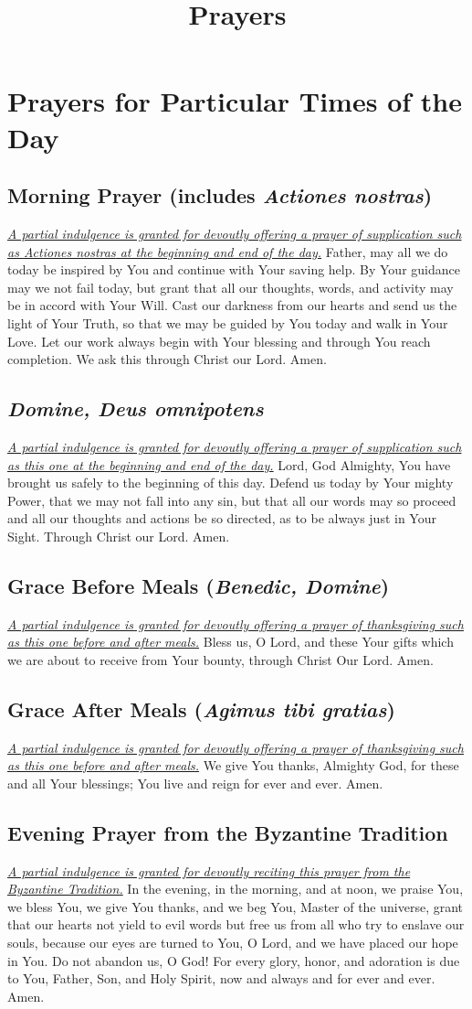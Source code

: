\documentclass[12pt]{article}
\newcommand{\prayersection}[1]{\section{#1}}
\newcommand{\prayertitle}[1]{\subsection{#1}}
\newcommand{\indulgencedprayertitle}[1]{\prayertitle{#1 \protect\kreuz}}
\newcommand{\emphasis}[1]{\emph{#1}}
\newcommand{\emphasis}[1]{\textsl{#1}}
\newcommand{\foreign}[1]{\emphasis{#1}}
\newcommand{\note}[1]{{\small{\emphasis{#1}}}\newline}
\newcommand{\linkednote}[2]{\hyperlink{#1}{\note{#2}}}
\begin{document}
\title{\textbf{Prayers}\date{\vspace{-10ex}}}\maketitle
\tableofcontents\newpage

\prayersection{Prayers for Particular Times of the Day}
\indulgencedprayertitle{Morning Prayer (includes \foreign{Actiones nostras})}
\linkednote{grant26}{A partial indulgence is granted for devoutly offering a prayer of supplication such as \foreign{Actiones nostras} at the beginning and end of the day.}
Father, may all we do today be inspired by You and continue with Your saving help.
By Your guidance may we not fail today, but grant that all our thoughts, words, and activity may be in accord with Your Will.
Cast our darkness from our hearts and send us the light of Your Truth, so that we may be guided by You today and walk in Your Love.
Let our work always begin with Your blessing and through You reach completion.
We ask this through Christ our Lord.
Amen.

\indulgencedprayertitle{\foreign{Domine, Deus omnipotens}}
\linkednote{grant26}{A partial indulgence is granted for devoutly offering a prayer of supplication such as this one at the beginning and end of the day.}
Lord, God Almighty, You have brought us safely to the beginning of this day.
Defend us today by Your mighty Power, that we may not fall into any sin, but that all our words may so proceed and all our thoughts and actions be so directed, as to be always just in Your Sight.
Through Christ our Lord.
Amen.

\indulgencedprayertitle{Grace Before Meals (\foreign{Benedic, Domine})}
\linkednote{grant26}{A partial indulgence is granted for devoutly offering a prayer of thanksgiving such as this one before and after meals.}
Bless us, O Lord, and these Your gifts which we are about to receive from Your bounty, through Christ Our Lord.
Amen.

\indulgencedprayertitle{Grace After Meals (\foreign{Agimus tibi gratias})}
\linkednote{grant26}{A partial indulgence is granted for devoutly offering a prayer of thanksgiving such as this one before and after meals.}
We give You thanks, Almighty God, for these and all Your blessings;
You live and reign for ever and ever.
Amen.
\newpage
\indulgencedprayertitle{Evening Prayer from the Byzantine Tradition}
\linkednote{grant23}{A partial indulgence is granted for devoutly reciting this prayer from the Byzantine Tradition.}
In the evening, in the morning, and at noon, we praise You, we bless You,
we give You thanks, and we beg You, Master of the universe, grant that our hearts not yield to evil words but free us from all who try to enslave our souls, because our eyes are turned to You, O Lord, and we have placed our hope in You.
Do not abandon us, O God!
For every glory, honor, and adoration is due to You, Father, Son, and Holy Spirit, now and always and for ever and ever.
Amen.
\end{document}
